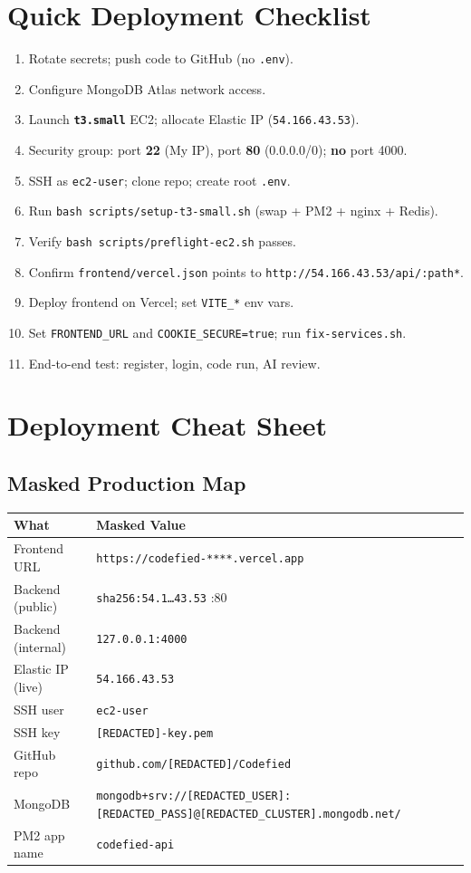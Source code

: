 \documentclass[11pt,a4paper]{article}
\makeatletter
\newcommand{\maskedectwoip}{\texttt{sha256:54.1\ldots 43.53}}
\newcommand{\maskedvercelurl}{\texttt{https://codefied-****.vercel.app}}
\newcommand{\maskedmongouri}{\texttt{mongodb+srv://[REDACTED\_USER]:[REDACTED\_PASS]@[REDACTED\_CLUSTER].mongodb.net/}}
\newcommand{\maskedgithub}{\texttt{github.com/[REDACTED]/Codefied}}
\newcommand{\maskedpem}{\texttt{[REDACTED]-key.pem}}
\newcommand{\productionip}{\texttt{54.166.43.53}}
\makeatother
\begin{document}
\section{Quick Deployment Checklist}
\begin{enumerate}
  \item Rotate secrets; push code to GitHub (no \texttt{.env}).
  \item Configure MongoDB Atlas network access.
  \item Launch \textbf{\texttt{t3.small}} EC2; allocate Elastic IP (\productionip).
  \item Security group: port \textbf{22} (My IP), port \textbf{80} (0.0.0.0/0); \textbf{no} port 4000.
  \item SSH as \texttt{ec2-user}; clone repo; create root \texttt{.env}.
  \item Run \texttt{bash scripts/setup-t3-small.sh} (swap + PM2 + nginx + Redis).
  \item Verify \texttt{bash scripts/preflight-ec2.sh} passes.
  \item Confirm \texttt{frontend/vercel.json} points to \texttt{http://54.166.43.53/api/:path*}.
  \item Deploy frontend on Vercel; set \texttt{VITE\_*} env vars.
  \item Set \texttt{FRONTEND\_URL} and \texttt{COOKIE\_SECURE=true}; run \texttt{fix-services.sh}.
  \item End-to-end test: register, login, code run, AI review.
\end{enumerate}

\appendix
\section{Deployment Cheat Sheet}
\label{appendix:cheatsheet}

\subsection{Masked Production Map}
\begin{table}[h]
\centering
\small
\begin{tabular}{@{}ll@{}}
\toprule
\textbf{What} & \textbf{Masked Value} \\
\midrule
Frontend URL       & \maskedvercelurl \\
Backend (public)   & \maskedectwoip{} :80 \\
Backend (internal) & \texttt{127.0.0.1:4000} \\
Elastic IP (live)  & \productionip \\
SSH user           & \texttt{ec2-user} \\
SSH key            & \maskedpem \\
GitHub repo        & \maskedgithub \\
MongoDB            & \maskedmongouri \\
PM2 app name       & \texttt{codefied-api} \\
\bottomrule
\end{tabular}
\end{table}
\end{document}

